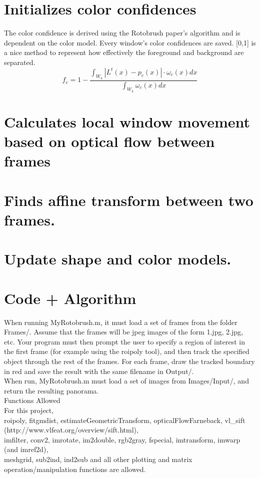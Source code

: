 \documentclass[15pt]{article}
\begin{document}
\section{Initializes color confidences}
The color confidence is derived using the Rotobrush paper's algorithm and is dependent on the color model. Every window's color confidences are saved. [0,1] is a nice method to represent how effectively the foreground and background are separated.
\begin{equation}
f_{c}=1-\frac{\int_{W_{k}}\left|L^{t}(x)-p_{c}(x)\right| \cdot \omega_{c}(x) d x}{\int_{W_{k}} \omega_{c}(x) d x}
\end{equation}

\section{Calculates local window movement based on optical flow between frames}

\section{Finds affine transform between two frames.}
\section{Update shape and color models.}

\section{Code + Algorithm}

When running MyRotobrush.m, it must load a set of frames from the folder Frames/. Assume that the frames will be jpeg images of the form 1.jpg, 2.jpg, etc. Your program must then prompt the user to specify a region of interest in the first frame (for example using the roipoly tool), and then track the specified object through the rest of the frames. For each frame, draw the tracked boundary in red and save the result with the same filename in Output/.
\\
When run, MyRotobrush.m must load a set of images from Images/Input/, and return the resulting panorama.
\\
Functions Allowed\\
For this project, \\
roipoly, fitgmdist, estimateGeometricTransform, opticalFlowFarneback, vl\_sift\\ (http://www.vlfeat.org/overview/sift.html), \\
imfilter, conv2, imrotate, im2double, rgb2gray, fspecial, imtransform, imwarp (and imref2d),\\ meshgrid, sub2ind, ind2sub and all other plotting and matrix operation/manipulation functions are allowed.
\end{document}
